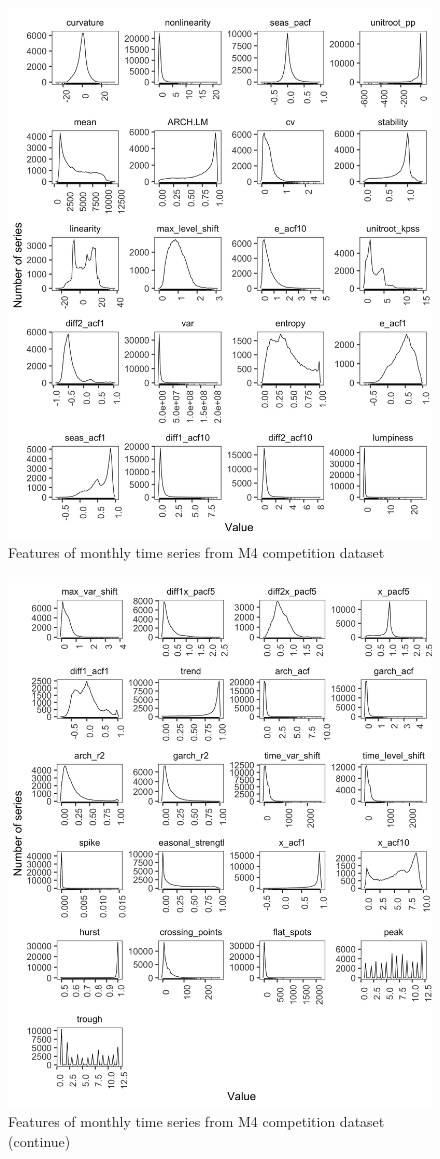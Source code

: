 \documentclass[preprint, 3p,
authoryear]{elsarticle} %
\begin{document}
\begin{figure}[H]

{\centering \includegraphics[width=0.7\linewidth]{img/300dpi/featurets1} 

}

\caption{Features of monthly time series from M4 competition dataset}\label{fig:feature1}
\end{figure}

\begin{figure}[H]

{\centering \includegraphics[width=0.7\linewidth]{img/300dpi/featurets2} 

}

\caption{Features of monthly time series from M4 competition dataset (continue)}\label{fig:feature2}
\end{figure}
\end{document}
